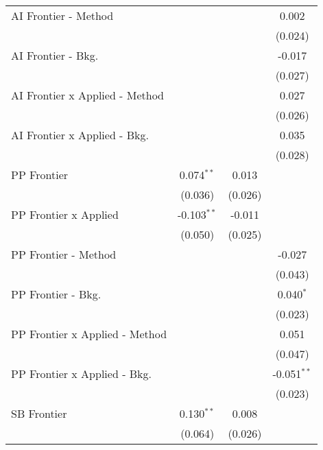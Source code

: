 \begin{tabular}{lccc}
   AI Frontier - Method           &               &              & 0.002\\   
                                  &               &              & (0.024)\\   
   AI Frontier - Bkg.             &               &              & -0.017\\   
                                  &               &              & (0.027)\\   
   AI Frontier x Applied - Method &               &              & 0.027\\   
                                  &               &              & (0.026)\\   
   AI Frontier x Applied - Bkg.   &               &              & 0.035\\   
                                  &               &              & (0.028)\\   
   PP Frontier                    & 0.074$^{**}$  & 0.013        &   \\   
                                  & (0.036)       & (0.026)      &   \\   
   PP Frontier x Applied          & -0.103$^{**}$ & -0.011       &   \\   
                                  & (0.050)       & (0.025)      &   \\   
   PP Frontier - Method           &               &              & -0.027\\   
                                  &               &              & (0.043)\\   
   PP Frontier - Bkg.             &               &              & 0.040$^{*}$\\   
                                  &               &              & (0.023)\\   
   PP Frontier x Applied - Method &               &              & 0.051\\   
                                  &               &              & (0.047)\\   
   PP Frontier x Applied - Bkg.   &               &              & -0.051$^{**}$\\   
                                  &               &              & (0.023)\\   
   SB Frontier                    & 0.130$^{**}$  & 0.008        &   \\   
                                  & (0.064)       & (0.026)      &   \\   

\end{tabular}
